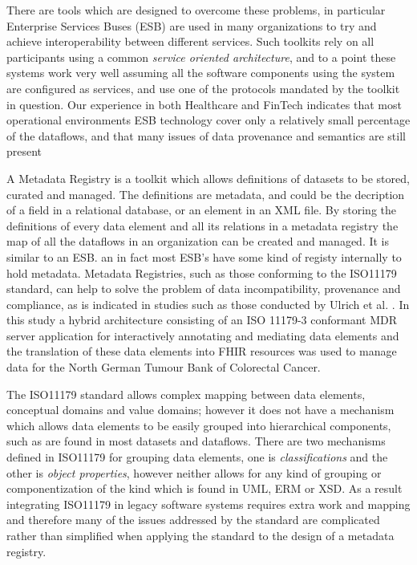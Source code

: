 \documentclass{llncs}
\begin{document}
	There are tools which are designed to overcome these problems, in particular Enterprise Services Buses (ESB) are used in many organizations to try and achieve interoperability between different services. Such toolkits rely on all participants using a common \emph{service oriented architecture}, and to a point these systems work very well assuming all the software components using the system are configured as services, and use one of the protocols mandated by the toolkit in question.  Our experience in both Healthcare and FinTech indicates that most operational environments ESB technology cover only a relatively small percentage of the dataflows, and that many issues of data provenance and semantics are still present
	
	A Metadata Registry is a toolkit which allows definitions of datasets to be stored, curated and managed. The definitions are metadata, and could be the decription of a field in a relational database, or an element in an XML file. By storing the definitions of every data element and all its relations in a metadata registry the map of all the dataflows in an organization can be created and managed. It is similar to an ESB. an in fact most ESB's have some kind of registy internally to hold metadata. Metadata Registries, such as those conforming to the ISO11179 standard, can help to solve the problem of data incompatibility, provenance and compliance, as is indicated in studies such as those conducted by Ulrich et al. \cite{MDRHL7} . In this study a hybrid architecture consisting of an ISO 11179-3 conformant MDR server application for interactively annotating and mediating data elements and the translation of these data elements into FHIR resources was used to manage data for the North German Tumour Bank of Colorectal Cancer. 
	
	The ISO11179 standard allows complex mapping between data elements, conceptual domains and value domains; however it does not have a mechanism which allows data elements to be easily grouped into hierarchical components, such as are found in most datasets and dataflows. There are two mechanisms defined in ISO11179 for grouping data elements, one is \emph{classifications} and the other is \emph{object properties}, however neither allows for any kind of grouping or componentization of the kind which is found in UML, ERM or XSD. As a result integrating ISO11179 in legacy software systems requires extra work and mapping and therefore many of the issues addressed by the standard are complicated rather than simplified when applying the standard to the design of a metadata registry. 
	
\end{document}
